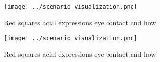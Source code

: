 \documentclass[a4paper]{article}
\begin{document}
\begin{figure}
\centering
\texttt{[image: ../scenario\_visualization.png]}
\caption{Red squares acial expressions eye contact and how
}
\end{figure}
 
\begin{figure}
\centering
\texttt{[image: ../scenario\_visualization.png]}
\caption{Red squares acial expressions eye contact and how
}
\end{figure}
 
\end{document}

